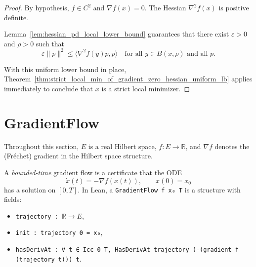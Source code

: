 \begin{proof}
  \leanok{}
  By hypothesis, $f \in C^2$ and $\nabla f(x) = 0$. The Hessian $\nabla^2 f(x)$ is positive definite.

  Lemma~\ref{lem:hessian_pd_local_lower_bound} guarantees that there exist $\varepsilon > 0$ and $\rho > 0$ such that
  \[
    \varepsilon \|p\|^2 \le \langle \nabla^2 f(y) p, p \rangle \quad \text{for all } y \in B(x, \rho) \text{ and all } p.
  \]

  With this uniform lower bound in place, Theorem~\ref{thm:strict_local_min_of_gradient_zero_hessian_uniform_lb}
  applies immediately to conclude that $x$ is a strict local minimizer.
\end{proof}


\chapter{GradientFlow}\label{sec:GradientFlow}

Throughout this section, $E$ is a real Hilbert space, $f : E \to \mathbb{R}$,
and $\nabla f$ denotes the (Fr\'echet) gradient in the Hilbert space structure.


\begin{definition}\label{def:GradientFlow}
  \leanok{}
  \uses{}
  A \emph{bounded-time} gradient flow is a certificate that the ODE
  \[
    \dot x(t) = -\nabla f(x(t)),\qquad x(0)=x_0
  \]
  has a solution on $[0,T]$.
  In Lean, a \texttt{GradientFlow f x₀ T} is a structure with fields:
  \begin{itemize}
    \item \texttt{trajectory : $\mathbb{R}\to E$},
    \item \texttt{init : trajectory 0 = x₀},
    \item \texttt{hasDerivAt : ∀ t ∈ Icc 0 T, HasDerivAt trajectory (-(gradient f (trajectory t))) t}.
  \end{itemize}
\end{definition}

